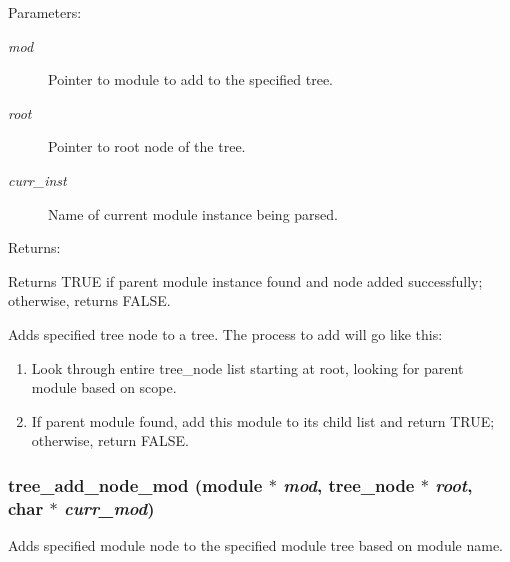 \begin{Desc}
\item[Parameters: ]\par
\begin{description}
\item[{\em 
mod}]Pointer to module to add to the specified tree. \item[{\em 
root}]Pointer to root node of the tree. \item[{\em 
curr\_\-inst}]Name of current module instance being parsed.\end{description}
\end{Desc}
\begin{Desc}
\item[Returns: ]\par
Returns TRUE if parent module instance found and node added successfully; otherwise, returns FALSE.\end{Desc}
Adds specified tree node to a tree. The process to add will go like this:\begin{enumerate}
\item 
Look through entire tree\_\-node list starting at root, looking for parent module based on scope.\item 
If parent module found, add this module to its child list and return TRUE; otherwise, return FALSE. \end{enumerate}
\subsubsection{ tree\_\-add\_\-node\_\-mod ({\bf module} $\ast$ {\em mod}, {\bf tree\_\-node} $\ast$ {\em root}, char $\ast$ {\em curr\_\-mod})}\label{tree_8h_a1}


Adds specified module node to the specified module tree based on module name.

